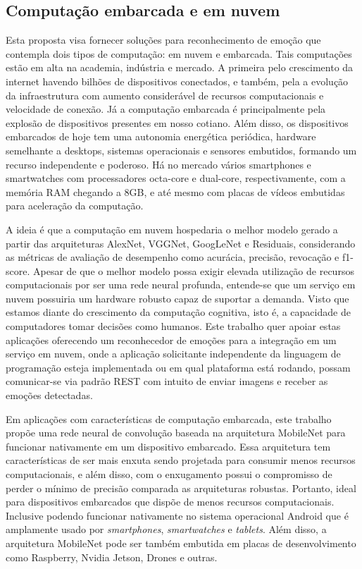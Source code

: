 \subsection{Computação embarcada e em nuvem}
Esta proposta visa fornecer soluções para reconhecimento de emoção que contempla dois tipos de computação: em nuvem e embarcada. Tais computações estão em alta na academia, indústria e mercado. A primeira pelo crescimento da internet havendo bilhões de dispositivos conectados, e também, pela a evolução da infraestrutura com aumento considerável de recursos computacionais e velocidade de conexão. Já a computação embarcada é principalmente pela explosão de dispositivos presentes em nosso cotiano. Além disso, os dispositivos embarcados de hoje tem uma autonomia energética periódica, hardware semelhante a desktops, sistemas operacionais e sensores embutidos, formando um recurso independente e poderoso. Há no mercado vários smartphones e smartwatches com processadores octa-core e dual-core, respectivamente, com a memória RAM chegando a 8GB, e até mesmo com placas de vídeos embutidas para aceleração da computação.        

A ideia é que a computação em nuvem hospedaria o melhor modelo gerado a partir das arquiteturas AlexNet, VGGNet, GoogLeNet e Residuais, considerando as métricas de avaliação de desempenho como acurácia, precisão, revocação e f1-score. Apesar de que o melhor modelo possa exigir elevada utilização de recursos computacionais por ser uma rede neural profunda, entende-se que um serviço em nuvem possuiria um hardware robusto capaz de suportar a demanda. Visto que estamos diante do crescimento da computação cognitiva, isto é, a capacidade de computadores tomar decisões como humanos. Este trabalho quer apoiar estas aplicações oferecendo um reconhecedor de emoções para a integração em um serviço em nuvem, onde a aplicação solicitante independente da linguagem de programação esteja implementada ou em qual plataforma está rodando, possam comunicar-se via padrão REST com intuito de enviar imagens e receber as emoções detectadas.    

Em aplicações com características de computação embarcada, este trabalho propõe uma rede neural de convolução baseada na arquitetura MobileNet para funcionar nativamente em um dispositivo embarcado. Essa arquitetura tem características de ser mais enxuta sendo projetada para consumir menos recursos computacionais, e além disso, com o enxugamento possui o compromisso de perder o mínimo de precisão comparada as arquiteturas robustas. Portanto, ideal para dispositivos embarcados que dispõe de menos recursos computacionais. Inclusive podendo funcionar nativamente no sistema operacional Android que é amplamente usado por \textit{smartphones}, \textit{smartwatches} e \textit{tablets}. Além disso, a arquitetura MobileNet pode ser também embutida em placas de desenvolvimento como Raspberry, Nvidia Jetson, Drones e outras.  

